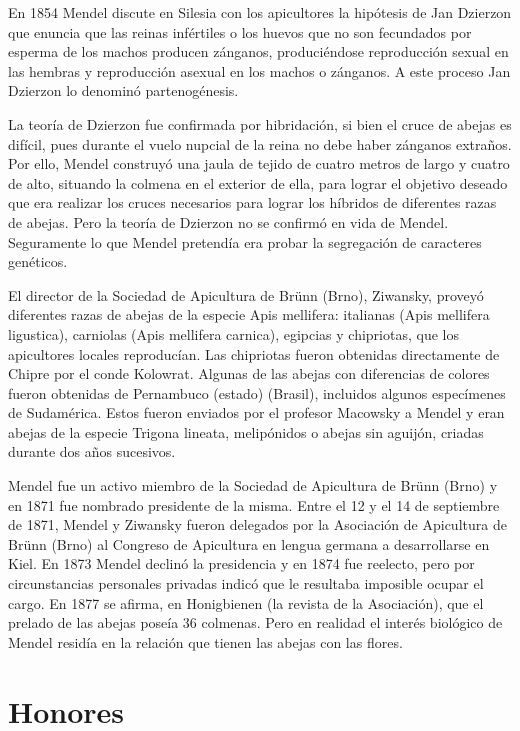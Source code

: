 \documentclass[letterpaper,11pt]{report}
\begin{document}
En 1854 Mendel discute en Silesia con los apicultores la hipótesis de Jan Dzierzon que enuncia que las reinas infértiles o los huevos que no son fecundados por esperma de los machos producen zánganos, produciéndose reproducción sexual en las hembras y reproducción asexual en los machos o zánganos. A este proceso Jan Dzierzon lo denominó partenogénesis.

La teoría de Dzierzon fue confirmada por hibridación, si bien el cruce de abejas es difícil, pues durante el vuelo nupcial de la reina no debe haber zánganos extraños. Por ello, Mendel construyó una jaula de tejido de cuatro metros de largo y cuatro de alto, situando la colmena en el exterior de ella, para lograr el objetivo deseado que era realizar los cruces necesarios para lograr los híbridos de diferentes razas de abejas. Pero la teoría de Dzierzon no se confirmó en vida de Mendel. Seguramente lo que Mendel pretendía era probar la segregación de caracteres genéticos.

El director de la Sociedad de Apicultura de Brünn (Brno), Ziwansky, proveyó diferentes razas de abejas de la especie Apis mellifera: italianas (Apis mellifera ligustica), carniolas (Apis mellifera carnica), egipcias y chipriotas, que los apicultores locales reproducían. Las chipriotas fueron obtenidas directamente de Chipre por el conde Kolowrat. Algunas de las abejas con diferencias de colores fueron obtenidas de Pernambuco (estado) (Brasil), incluidos algunos especímenes de Sudamérica. Estos fueron enviados por el profesor Macowsky a Mendel y eran abejas de la especie Trigona lineata, melipónidos o abejas sin aguijón, criadas durante dos años sucesivos.

Mendel fue un activo miembro de la Sociedad de Apicultura de Brünn (Brno) y en 1871 fue nombrado presidente de la misma. Entre el 12 y el 14 de septiembre de 1871, Mendel y Ziwansky fueron delegados por la Asociación de Apicultura de Brünn (Brno) al Congreso de Apicultura en lengua germana a desarrollarse en Kiel. En 1873 Mendel declinó la presidencia y en 1874 fue reelecto, pero por circunstancias personales privadas indicó que le resultaba imposible ocupar el cargo. En 1877 se afirma, en Honigbienen (la revista de la Asociación), que el prelado de las abejas poseía 36 colmenas. Pero en realidad el interés biológico de Mendel residía en la relación que tienen las abejas con las flores.

\newpage


\chapter{Honores}
\end{document}
